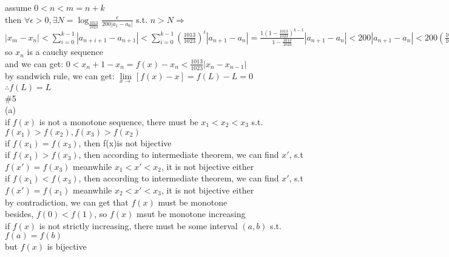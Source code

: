 \documentclass{article}
\begin{document}
assume $0<n<m=n+k$\\

then $\forall\epsilon>0, \exists N=\log_{\frac{1013}{1023}}\displaystyle\frac{\epsilon}{200|a_1-a_0|}$ s.t. $n>N\Rightarrow$ $\displaystyle
|x_m-x_n|<\sum_{i=0}^{k-1}|a_{n+i+1}-a_{n+1}|<\sum_{i=0}^{k-1}\left(\displaystyle\frac{1013}{1023}\right)^i|a_{n+1}-a_n|=\frac{1\left(1-\frac{1013}{1023}\right)^{k-1}}{1-\frac{1013}{1023}}|a_{n+1}-a_n|<200|a_{n+1}-a_n|<200\left(\frac{1013}{1023}\right)^n|a_1-a_0|<\epsilon$\\

so $x_n$ is a cauchy sequence\\

and we can get: $0<x_n+1-x_n=f(x)-x_n<\displaystyle\frac{1013}{1023}|x_n-x_{n-1}|$\\

by sandwich rule, we can get: $\lim \limits_{x \to }[f(x)-x]=f(L)-L=0$\\

$\therefore$\qquad$f(L)=L$\\

\textcolor[rgb]{0.00,0.00,0.50}{\#5}\\

(a)\\

if $f(x)$ is not a monotone sequence, there must be $x_1<x_2<x_3$ s.t. $f(x_1)>f(x_2),f(x_3)>f(x_2)$\\

if $f(x_1)=f(x_3)$, then f(x)is not bijective\\

if $f(x_1)>f(x_3)$, then according to intermediate theorem, we can find $x'$, s.t $f(x')=f(x_3)$ meanwhile $x_1<x'<x_2$, it is not bijective either\\

if $f(x_1)<f(x_3)$, then according to intermediate theorem, we can find $x'$, s.t $f(x')=f(x_1)$ meanwhile $x_2<x'<x_3$, it is not bijective either\\

by contradiction, we can get that $f(x)$ must be monotone\\

besides, $f(0)<f(1)$, so $f(x)$ msut be monotone increasing\\

if $f(x)$ is not strictly increasing, there must be some interval $(a,b)$ s.t. $f(a)=f(b)$\\

but $f(x)$ is bijective\\
\end{document}
